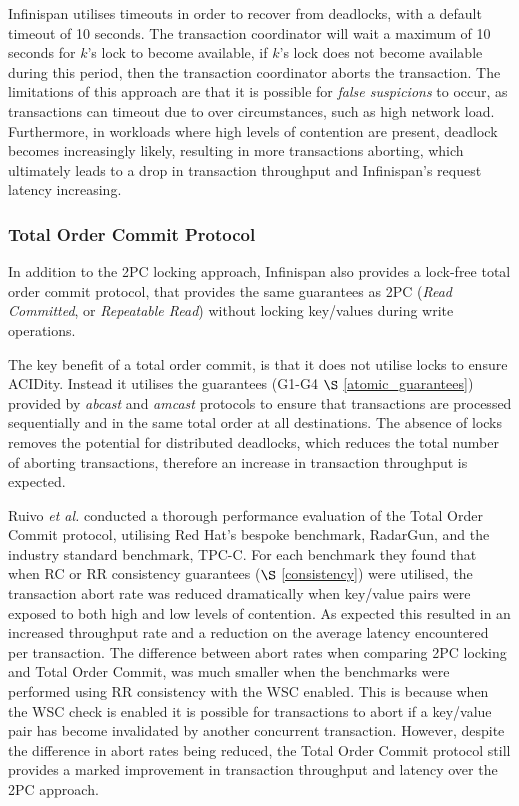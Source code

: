 	        Infinispan utilises timeouts in order to recover from deadlocks, with a default timeout of 10 seconds.  The transaction coordinator will wait a maximum of 10 seconds for $k$'s lock to become available, if $k$'s lock does not become available during this period, then the transaction coordinator aborts the transaction.  The limitations of this approach are that it is possible for \emph{false suspicions} to occur, as transactions can timeout due to over circumstances, such as high network load.  Furthermore, in workloads where high levels of contention are present, deadlock becomes increasingly likely, resulting in more transactions aborting, which ultimately leads to a drop in transaction throughput and Infinispan's request latency increasing.  

	    \subsubsection{Total Order Commit Protocol} \label{sec:to_commit}
	    In addition to the 2PC locking approach, Infinispan also provides a lock-free total order commit protocol, that provides the same guarantees as 2PC (\emph{Read Committed}, or \emph{Repeatable Read}) without locking key/values during write operations.  
	    
	    The key benefit of a total order commit, is that it does not utilise locks to ensure ACIDity.  Instead it utilises the guarantees (G1-G4 $\S$ \ref{atomic_guarantees}) provided by \emph{abcast} and \emph{amcast} protocols to ensure that transactions are processed sequentially and in the same total order at all destinations.  The absence of locks removes the potential for distributed deadlocks, which reduces the total number of aborting transactions, therefore an increase in transaction throughput is expected.  
	    
	    Ruivo \emph{et al.}\citep{Ruivo:2011:ETO:2120967.2121604} conducted a thorough performance evaluation of the Total Order Commit protocol, utilising Red Hat's bespoke benchmark, RadarGun\citep{RadarGun}, and the industry standard benchmark, TPC-C\citep{TPC-C}.  For each benchmark they found that when RC or RR consistency guarantees ($\S$ \ref{consistency}) were utilised, the transaction abort rate was reduced dramatically when key/value pairs were exposed to both high and low levels of contention.  As expected this resulted in an increased throughput rate and a reduction on the average latency encountered per transaction.  The difference between abort rates when comparing 2PC locking and Total Order Commit, was much smaller when the benchmarks were performed using RR consistency with the WSC enabled.  This is because when the WSC check is enabled it is possible for transactions to abort if a key/value pair has become invalidated by another concurrent transaction.  However, despite the difference in abort rates being reduced, the Total Order Commit protocol still provides a marked improvement in transaction throughput and latency over the 2PC approach.  
	    
